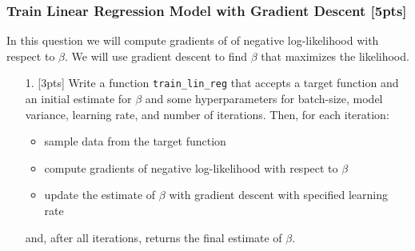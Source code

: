 \documentclass[12pt,a4paper]{article}
\begin{document}
\subsubsection{Train Linear Regression Model with Gradient Descent [5pts]}
In this question we will compute gradients of of negative log-likelihood with respect to $\beta$. We will use gradient descent to find $\beta$ that maximizes the likelihood.

\begin{itemize}
\item[1. ] [3pts] Write a function \texttt{train\_lin\_reg} that accepts a target function and an initial estimate for $\beta$ and some  hyperparameters for batch-size, model variance, learning rate, and number of iterations.  Then, for each iteration:

\begin{itemize}
\item sample data from the target function


\item compute gradients of negative log-likelihood with respect to $\beta$


\item update the estimate of $\beta$ with gradient descent with specified learning rate

\end{itemize}
and, after all iterations, returns the final estimate of $\beta$.

\end{itemize}
\end{document}
